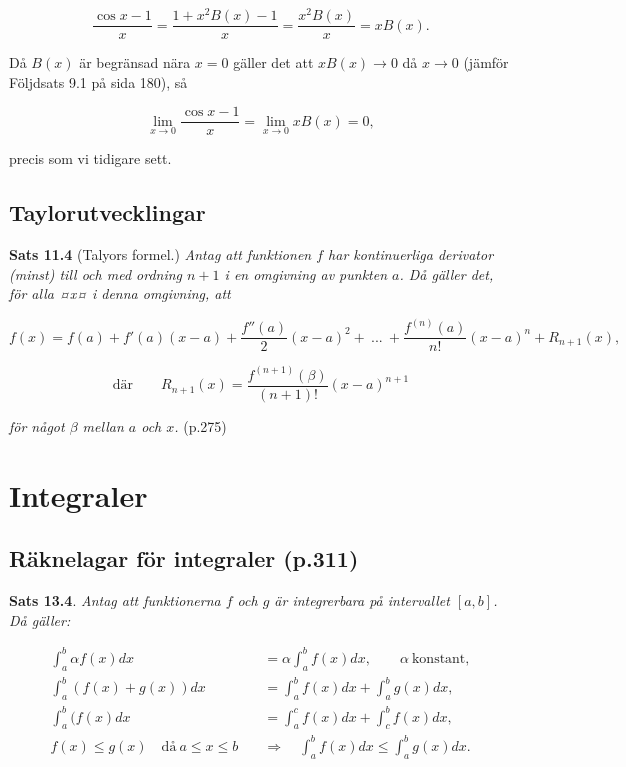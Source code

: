 \documentclass[11pt]{article}
\begin{document}
\[
    \frac{\cos x - 1}{x} = \frac{1 + x^2B(x) - 1}{x} = \frac{x^2B(x)}{x} = xB(x).
\]

Då $B(x)$ är begränsad nära $x = 0$ gäller det att $xB(x) \to 0$ då $x \to 0$ (jämför Följdsats 9.1 på sida 180), så

\[
    \lim_{x \to 0} \frac{\cos x - 1}{x} = \lim_{x \to 0} xB(x) = 0,
\]

precis som vi tidigare sett.

\subsection{Taylorutvecklingar}

\textbf{Sats 11.4} (Talyors formel.) \textit{Antag att funktionen $f$ har kontinuerliga derivator (minst) till och med ordning $n + 1$ i en omgivning av punkten $a$. Då gäller det, för alla ¤x¤ i denna omgivning, att}

\begin{equation}
    f(x) = f(a) + f'(a)(x - a) + \frac{f''(a)}{2}(x - a)^2 +\ ...\ + \frac{f^{(n)}(a)}{n!}(x - a)^n + R_{n + 1}(x),
\end{equation}

\begin{equation}
    \text{där}\qquad R_{n + 1}(x) = \frac{f^{(n + 1)}(\beta)}{(n + 1)!}(x - a)^{n + 1}
\end{equation}

\textit{för något $\beta$ mellan $a$ och $x$.} (p.275)

\newpage
\section{Integraler}

\subsection{Räknelagar för integraler (p.311)}

\textbf{Sats 13.4}. \textit{Antag att funktionerna $f$ och $g$ är integrerbara på intervallet $[a, b]$. Då gäller:}

\begin{align}
    \int_a^b{\alpha f(x)} dx &= \alpha \int_a^b{f(x)} dx, \qquad \alpha\ \text{konstant},\\
    \int_a^b{(f(x) + g(x))} dx &= \int_a^b{f(x)} dx + \int_a^b{g(x)} dx,\\
    \int_a^b{(f(x)} dx &= \int_a^c{f(x)} dx + \int_c^b{f(x)} dx,\\
    f(x) \leq g(x) \quad \text{då}\ a \leq x \leq b \quad &\Rightarrow \quad \int_a^b{f(x)} dx \leq \int_a^b{g(x)} dx.
\end{align}
\end{document}
